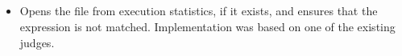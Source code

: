 \subsection*{}\label{subsec:PSQLErrorPostcondition}
\begin{itemize}[label={}]
    \item Opens the  file from execution statistics, if it exists, and ensures that the
           expression is not matched.
          Implementation was based on one of the existing judges.
\end{itemize}
